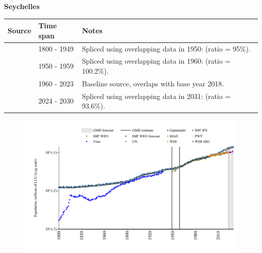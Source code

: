 \documentclass[12pt,a4paper,landscape]{article}
\begin{document}
\begin{adjustbox}{max totalsize={\paperwidth}{\paperheight},center}
\begin{minipage}[t][\textheight][t]{\textwidth}
\vspace*{0.5cm}
{}
\begin{center}
{\Large\bfseries Seychelles}
\end{center}
\vspace{0.5cm}
\begin{table}[H]
\centering
\small
\begin{tabular}{|l|l|l|}
\hline
\textbf{Source} & \textbf{Time span} & \textbf{Notes} \\
\hline
\rowcolor{white}\cite{Gapminder}& 1800 - 1949 &Spliced using overlapping data in 1950: (ratio = 95\%).\\
\rowcolor{lightgray}\cite{IMF_IFS}& 1950 - 1959 &Spliced using overlapping data in 1960: (ratio = 100.2\%).\\
\rowcolor{white}\cite{WDI}& 1960 - 2023 &Baseline source, overlaps with base year 2018.\\
\rowcolor{lightgray}\cite{Gapminder}& 2024 - 2030 &Spliced using overlapping data in 2031: (ratio = 93.6\%).\\
\hline
\end{tabular}
\end{table}
\begin{figure}[H]
\centering
\includegraphics[width=\textwidth,height=0.6\textheight,keepaspectratio]{graphs/SYC_pop.pdf}
\end{figure}
\end{minipage}
\end{adjustbox}
\end{document}
